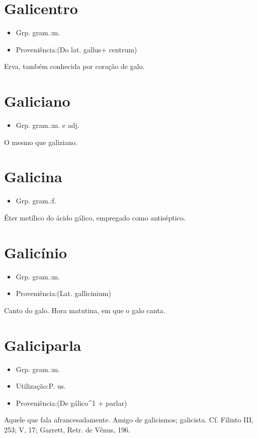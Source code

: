 \section{Galicentro}
\begin{itemize}
\item {Grp. gram.:m.}
\end{itemize}
\begin{itemize}
\item {Proveniência:(Do lat. \textunderscore gallus\textunderscore  + \textunderscore centrum\textunderscore )}
\end{itemize}
Erva, também conhecida por \textunderscore coração de galo\textunderscore .
\section{Galiciano}
\begin{itemize}
\item {Grp. gram.:m.  e  adj.}
\end{itemize}
O mesmo que \textunderscore galiziano\textunderscore .
\section{Galicina}
\begin{itemize}
\item {Grp. gram.:f.}
\end{itemize}
Éter metílico do ácido gálico, empregado como antiséptico.
\section{Galicínio}
\begin{itemize}
\item {Grp. gram.:m.}
\end{itemize}
\begin{itemize}
\item {Proveniência:(Lat. \textunderscore gallicinium\textunderscore )}
\end{itemize}
Canto do galo.
Hora matutina, em que o galo canta.
\section{Galiciparla}
\begin{itemize}
\item {Grp. gram.:m.}
\end{itemize}
\begin{itemize}
\item {Utilização:P. us.}
\end{itemize}
\begin{itemize}
\item {Proveniência:(De \textunderscore gálico\textunderscore ^1 + \textunderscore parlar\textunderscore )}
\end{itemize}
Aquele que fala afrancesadamente.
Amigo de galicismos; galicista. Cf. Filinto III, 253; V, 17; Garrett, \textunderscore Retr. de Vênus\textunderscore , 196.
